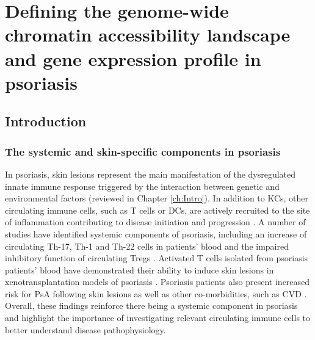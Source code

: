 \chapter{Defining the genome-wide chromatin accessibility landscape and gene expression profile in psoriasis}
\label{ch:Results 2}


\section{Introduction}

\subsection{The systemic and skin-specific components in psoriasis}

In psoriasis, skin lesions represent the main manifestation of the dysregulated innate immune response triggered by the interaction between genetic and environmental factors (reviewed in Chapter \ref{ch:Intro}). In addition to KCs, other circulating immune cells, such as T cells or DCs, are actively recruited to the site of inflammation contributing to disease initiation and progression \parencite{Leanne2012}. A number of studies have identified systemic components of psoriasis, including an increase of circulating Th-17, Th-1 and Th-22 cells in patients' blood and the impaired inhibitory function of circulating Tregs \parencite{Kagami2010,Sugiyama2005}. Activated T cells isolated from psoriasis patients' blood have demonstrated their ability to induce skin lesions in xenotransplantation models of psoriasis \parencite{Wrone-Smith1996,Nickoloff1999}. Psoriasis patients also present increased risk for PsA following skin lesions as well as other co-morbidities, such as CVD \parencite{Ibrahim2009,Shapiro2007}. Overall, these findings reinforce there being a systemic component in psoriasis and highlight the importance of investigating relevant circulating immune cells to better understand disease pathophysiology.



